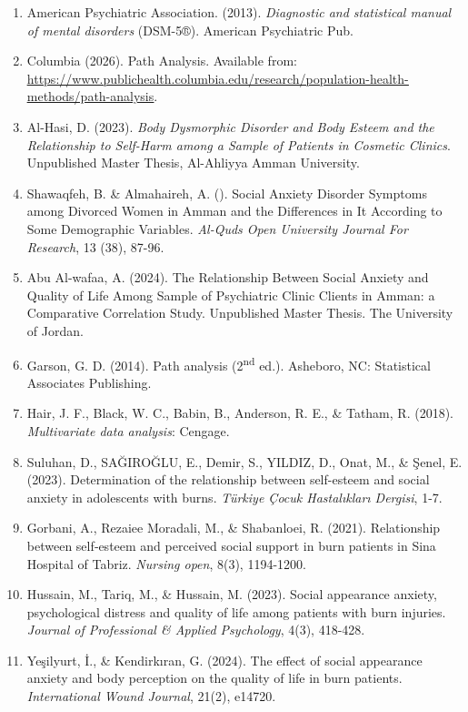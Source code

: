 \documentclass[
]{article}
\newcommand{\RL}[1]{\beginR #1\endR}
\newcommand{\RL}[1]{\bgroup\textdir TRT#1\egroup}
\begin{document}
\begin{enumerate}
{  Manual of Mental Disorders}, Alarabia for science.
\item
  American Psychiatric Association. (2013). \emph{Diagnostic and
  statistical manual of mental disorders} (DSM-5®). American Psychiatric
  Pub.
\item
  Columbia (2026). Path Analysis. Available from:
  \href{https://www.publichealth.columbia.edu/research/population-health-methods/path-analysis\#:~:text=Path\%20analysis\%20is\%20always\%20theory,remembered\%20when\%20performing\%20path\%20analysis}{\ul{https://www.publichealth.columbia.edu/research/population-health-methods/path-analysis}}.
\item
  Al-Hasi, D. (2023). \emph{Body Dysmorphic Disorder and Body Esteem and
  the Relationship to Self-Harm among a Sample of Patients in Cosmetic
  Clinics}. Unpublished Master Thesis, Al-Ahliyya Amman University.
\item
  Shawaqfeh, B. \& Almahaireh, A. (\RL{2022}). Social Anxiety Disorder
  Symptoms among Divorced Women in Amman and the Differences in It
  According to Some Demographic Variables. \emph{Al-Quds Open University
  Journal For Research}, 13 (38), 87-96.
\item
  Abu Al-wafaa, A. (2024). The Relationship Between Social Anxiety and
  Quality of Life Among Sample of Psychiatric Clinic Clients in Amman: a
  Comparative Correlation Study. Unpublished Master Thesis. The
  University of Jordan.
\item
  Garson, G. D. (2014). Path analysis (2\textsuperscript{nd} ed.).
  Asheboro, NC: Statistical Associates Publishing.
\item
  Hair, J. F., Black, W. C., Babin, B., Anderson, R. E., \& Tatham, R.
  (2018). \emph{Multivariate data analysis}: Cengage.
\item
  Suluhan, D., SAĞIROĞLU, E., Demir, S., YILDIZ, D., Onat, M., \& Şenel,
  E. (2023). Determination of the relationship between self-esteem and
  social anxiety in adolescents with burns. \emph{Türkiye Çocuk
  Hastalıkları Dergisi}, 1-7.
\item
  Gorbani, A., Rezaiee Moradali, M., \& Shabanloei, R. (2021).
  Relationship between self‐esteem and perceived social support in burn
  patients in Sina Hospital of Tabriz. \emph{Nursing open}, 8(3),
  1194-1200.
\item
  Hussain, M., Tariq, M., \& Hussain, M. (2023). Social appearance
  anxiety, psychological distress and quality of life among patients
  with burn injuries. \emph{Journal of Professional \& Applied
  Psychology}, 4(3), 418-428.
\item
  Yeşilyurt, İ., \& Kendirkıran, G. (2024). The effect of social
  appearance anxiety and body perception on the quality of life in burn
  patients. \emph{International Wound Journal}, 21(2), e14720.
\end{enumerate}
\end{document}
